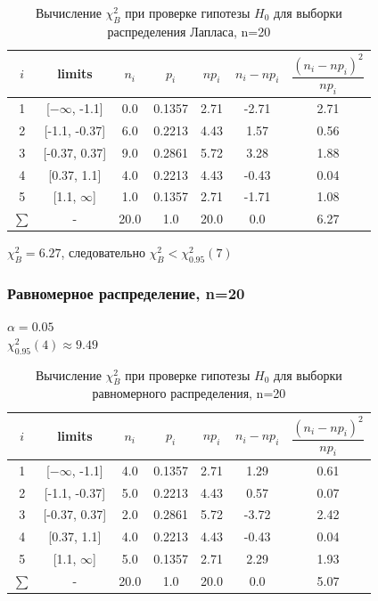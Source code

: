 \begin{table}[H]
	\begin{center}
		\begin{tabular}{|c|c|c|c|c|c|c|}
			\hline
			$i$ & limits & $n_i$ & $p_i$ & $np_i$ & $n_i - np_i$ & $\dfrac{(n_i-np_i)^2}{np_i}$ \\
			\hline
			1 & [$-\infty$, -1.1] & 0.0 & 0.1357 & 2.71 & -2.71 & 2.71 \\
			2 & [-1.1, -0.37] & 6.0 & 0.2213 & 4.43 & 1.57 & 0.56 \\
			3 & [-0.37, 0.37] & 9.0 & 0.2861 & 5.72 & 3.28 & 1.88 \\
			4 & [0.37, 1.1] & 4.0 & 0.2213 & 4.43 & -0.43 & 0.04 \\
			5 & [1.1, $\infty$] & 1.0 & 0.1357 & 2.71 & -1.71 & 1.08 \\
			\hline
			$\sum$ & - & 20.0 & 1.0 & 20.0 & 0.0 & 6.27\\
			\hline
		\end{tabular}
	\end{center}
	\caption{Вычисление $\chi_{B}^2$ при проверке гипотезы $H_0$ для выборки распределения Лапласа, n=20}
\end{table}

$\chi_{B}^2 = 6.27$, следовательно  $\chi_{B}^2 <\chi^{2}_{0.95}(7)$ \\
\subsubsection{Равномерное распределение, n=20}

$\alpha = 0.05$ \\
$\chi^{2}_{0.95}(4) \approx 9.49$ \\

\begin{table}[H]
	\begin{center}
		\begin{tabular}{|c|c|c|c|c|c|c|}
			\hline
			$i$ & limits & $n_i$ & $p_i$ & $np_i$ & $n_i - np_i$ & $\dfrac{(n_i-np_i)^2}{np_i}$ \\
			\hline
			1 & [$-\infty$, -1.1] & 4.0 & 0.1357 & 2.71 & 1.29 & 0.61 \\
			2 & [-1.1, -0.37] & 5.0 & 0.2213 & 4.43 & 0.57 & 0.07 \\
			3 & [-0.37, 0.37] & 2.0 & 0.2861 & 5.72 & -3.72 & 2.42 \\
			4 & [0.37, 1.1] & 4.0 & 0.2213 & 4.43 & -0.43 & 0.04 \\
			5 & [1.1, $\infty$] & 5.0 & 0.1357 & 2.71 & 2.29 & 1.93 \\
			\hline
			$\sum$ & - & 20.0 & 1.0 & 20.0 & 0.0 & 5.07\\
			\hline
		\end{tabular}
	\end{center}
	\caption{Вычисление $\chi_{B}^2$ при проверке гипотезы $H_0$ для выборки равномерного распределения, n=20}
\end{table} 

